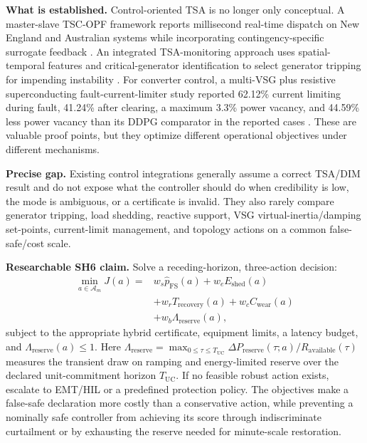 \documentclass[conference]{IEEEtran}
\begin{document}
\textbf{What is established.} Control-oriented TSA is no longer only conceptual. A master-slave TSC-OPF framework reports millisecond real-time dispatch on New England and Australian systems while incorporating contingency-specific surrogate feedback \cite{zhang2025tscopf}. An integrated TSA-monitoring approach uses spatial-temporal features and critical-generator identification to select generator tripping for impending instability \cite{zhu2024tsmae}. For converter control, a multi-VSG plus resistive superconducting fault-current-limiter study reported 62.12\% current limiting during fault, 41.24\% after clearing, a maximum 3.3\% power vacancy, and 44.59\% less power vacancy than its DDPG comparator in the reported cases \cite{chen2024vsg}. These are valuable proof points, but they optimize different operational objectives under different mechanisms.

\textbf{Precise gap.} Existing control integrations generally assume a correct TSA/DIM result and do not expose what the controller should do when credibility is low, the mode is ambiguous, or a certificate is invalid. They also rarely compare generator tripping, load shedding, reactive support, VSG virtual-inertia/damping set-points, current-limit management, and topology actions on a common false-safe/cost scale.

\textbf{Researchable SH6 claim.} Solve a receding-horizon, three-action decision:
\begin{equation}
\begin{aligned}
\min_{a\in\mathcal A_m}J(a)={}&
w_s\widehat p_{\mathrm{FS}}(a)+w_eE_{\mathrm{shed}}(a)\\
&+w_rT_{\mathrm{recovery}}(a)+w_cC_{\mathrm{wear}}(a)\\
&+w_b\Lambda_{\mathrm{reserve}}(a),
\end{aligned}
\label{eq:controlobjective}
\end{equation}
subject to the appropriate hybrid certificate, equipment limits, a latency budget, and $\Lambda_{\mathrm{reserve}}(a)\leq1$. Here $\Lambda_{\mathrm{reserve}}=\max_{0\leq\tau\leq T_{\mathrm{UC}}}\Delta P_{\mathrm{reserve}}(\tau;a)/R_{\mathrm{available}}(\tau)$ measures the transient draw on ramping and energy-limited reserve over the declared unit-commitment horizon $T_{\mathrm{UC}}$. If no feasible robust action exists, escalate to EMT/HIL or a predefined protection policy. The objectives make a false-safe declaration more costly than a conservative action, while preventing a nominally safe controller from achieving its score through indiscriminate curtailment or by exhausting the reserve needed for minute-scale restoration.
\end{document}
